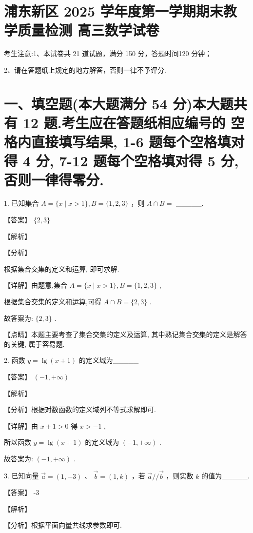\documentclass[10pt]{article}
\begin{document}
\section*{浦东新区 2025 学年度第一学期期末教学质量检测 高三数学试卷}

考生注意:1、本试卷共 21 道试题，满分 150 分，答题时间120 分钟；

2、请在答题纸上规定的地方解答，否则一律不予评分.

\section*{一、填空题(本大题满分 54 分)本大题共有 12 题.考生应在答题纸相应编号的 空格内直接填写结果, 1-6 题每个空格填对得 4 分, 7-12 题每个空格填对得 5 分, 否则一律得零分.}

1. 已知集合 \(A = \{ x \mid  x > 1\} ,B = \{ 1,2,3\}\) ，则 \(A \cap  B =\) \_\_\_\_\_.

【答案】 \(\{ 2,3\}\)

【解析】

【分析】

根据集合交集的定义和运算, 即可求解.

【详解】由题意,集合 \(A = \{ x \mid  x > 1\} ,B = \{ 1,2,3\}\) ,

根据集合交集的定义和运算,可得 \(A \cap  B = \{ 2,3\}\) .

故答案为: \(\{ 2,3\}\) .

【点睛】本题主要考查了集合交集的定义及运算, 其中熟记集合交集的定义是解答的关键, 属于容易题.

2. 函数 \(y = \lg \left( {x + 1}\right)\) 的定义域为\_\_\_\_\_

【答案】 \(\left( {-1, + \infty }\right)\)

【解析】

【分析】根据对数函数的定义域列不等式求解即可.

【详解】由 \(x + 1 > 0\) 得 \(x >  - 1\) ,

所以函数 \(y = \lg \left( {x + 1}\right)\) 的定义域为 \(\left( {-1, + \infty }\right)\) .

故答案为: \(\left( {-1, + \infty }\right)\) .

3. 已知向量 \(\overrightarrow{a} = \left( {1, - 3}\right)\) 、 \(\overrightarrow{b} = \left( {1,k}\right)\) ，若 \(\overrightarrow{a}//\overrightarrow{b}\) ，则实数 \(k\) 的值为\_\_\_\_\_.

【答案】 -3

【解析】

【分析】根据平面向量共线求参数即可.
\end{document}
